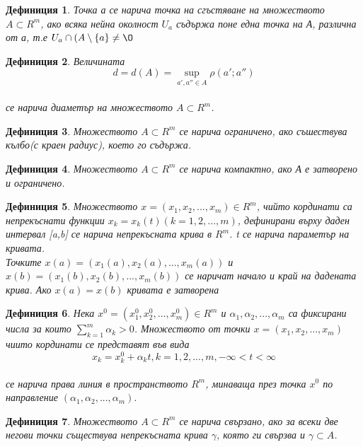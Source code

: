 \documentclass[fleqn]{article}
\newtheorem{definition}{Дефиниция}[subsection]
\begin{document}
\begin{definition}
Точка а се нарича точка на сгъстяване на множеството $A \subset R^m $, ако всяка нейна околност $U_a$ съдържа поне една точка на А, различна от а, т.е $U_a \cap (A\setminus \{ a \} \neq \O $
\end{definition}

\begin{definition}
Величината \\
$$d = d(A) = \sup_{a',a'' \in A} \rho(a';a'')$$\\
се нарича диаметър на множеството  $A \subset R^m $.
\end{definition}

\begin{definition}
Множеството  $A \subset R^m $ се нарича ограничено, ако съшествува кълбо(с краен радиус), което го съдържа.
\end{definition}

\begin{definition}
Множеството  $A \subset R^m $ се нарича компактно, ако А е затворено и ограничено.
\end{definition}

\begin{definition}
Множеството   $x = (x_1, x_2, ... , x_m) \in R^m$, чийто кординати са непрекъснати функции $x_k = x_k(t) (k = 1, 2, ..., m)$, дефинирани върху даден интервал [a,b] се нарича непрекъсната крива в $R^m$. t се нарича параметър на кривата.\\
Точките $x(a) = (x_1(a), x_2(a), ... , x_m(a))$ и $x(b) = (x_1(b), x_2(b), ... , x_m(b))$ се наричат начало и край на дадената крива. Ако $x(a) = x(b)$ кривата е затворена
\end{definition}

\begin{definition}
Нека $x^0 = (x_1^0, x_2^0, ... , x_m^0) \in R^m$ и $\alpha_1, \alpha_2, ... , \alpha_m$ са фиксирани числа за които $\sum_{k=1}^{m}\alpha_k > 0$. Множеството от точки $x = (x_1, x_2, ... , x_m)$ чиито кординати се представят във вида \\
$$x_k = x_k^0 + \alpha_kt, k = 1, 2, ..., m , -\infty < t <\infty $$\\
се нарича права линия в пространството $R^m$, минаваща през точка $x^0$ по направление $(\alpha_1, \alpha_2, ... , \alpha_m).$
\end{definition}

\begin{definition}
Множеството  $A \subset R^m $ се нарича свързано,  ако за всеки две негови точки съществува непрекъсната крива $\gamma$, която ги свързва и $\gamma \subset A$.
\end{definition}
\end{document}
